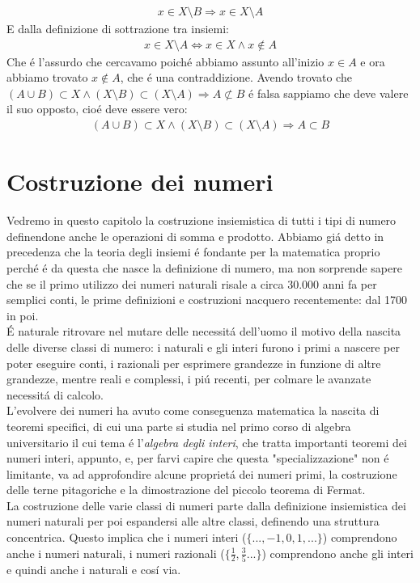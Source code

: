 \documentclass[twoside]{article} %
\begin{document}
	 \begin{gather*}
	 	x\in X\setminus B\Rightarrow x\in X\setminus A
	 \end{gather*}
	 E dalla definizione di sottrazione tra insiemi:
	 \begin{gather*}
	 	x\in X\setminus A\Leftrightarrow x\in X\wedge x\notin A
	 \end{gather*}
	 Che \'e l'assurdo che cercavamo poich\'e abbiamo assunto all'inizio $x\in A$ e ora abbiamo trovato $x\notin A$, che \'e una contraddizione. Avendo trovato che $(A\cup B)\subset X \wedge (X\setminus B)\subset (X\setminus A)\Rightarrow A\not\subset B$ \'e falsa sappiamo che deve valere il suo opposto, cio\'e deve essere vero:
	 \begin{gather*} 
	 	(A\cup B)\subset X \wedge (X\setminus B)\subset (X\setminus A)\Rightarrow A\subset B
	 \end{gather*}
	 
	 \newpage
	 \section{Costruzione dei numeri}
	 Vedremo in questo capitolo la costruzione insiemistica di tutti i tipi di numero definendone anche le operazioni di somma e prodotto. Abbiamo gi\'a detto in precedenza che la teoria degli insiemi \'e fondante per la matematica proprio perch\'e \'e da questa che nasce la definizione di numero, ma non sorprende sapere che se il primo utilizzo dei numeri naturali risale a circa 30.000 anni fa per semplici conti, le prime definizioni e costruzioni nacquero recentemente: dal 1700 in poi. \\
	 \'E naturale ritrovare nel mutare delle necessit\'a dell'uomo il motivo della nascita delle diverse classi di numero: i naturali e gli interi furono i primi a nascere per poter eseguire conti, i razionali per esprimere grandezze in funzione di altre grandezze, mentre reali e complessi, i pi\'u recenti, per colmare le avanzate necessit\'a di calcolo. \\
	 L'evolvere dei numeri ha avuto come conseguenza matematica la nascita di teoremi specifici, di cui una parte si studia nel primo corso di algebra universitario il cui tema \'e l'\textit{algebra degli interi}, che tratta importanti teoremi dei numeri interi, appunto, e, per farvi capire che questa "specializzazione" non \'e limitante, va ad approfondire alcune propriet\'a dei numeri primi, la costruzione delle terne pitagoriche e la dimostrazione del piccolo teorema di Fermat.\\
	  La costruzione delle varie classi di numeri parte dalla definizione insiemistica dei numeri naturali per poi espandersi alle altre classi, definendo una struttura concentrica. Questo implica che i numeri interi ($\{...,-1,0,1,...\}$) comprendono anche i numeri naturali, i numeri razionali ($\{\frac{1}{2},\frac{3}{5} ...\}$) comprendono anche gli interi e quindi anche i naturali e cos\'i via.
	  \newpage	 
	  
\end{document}
